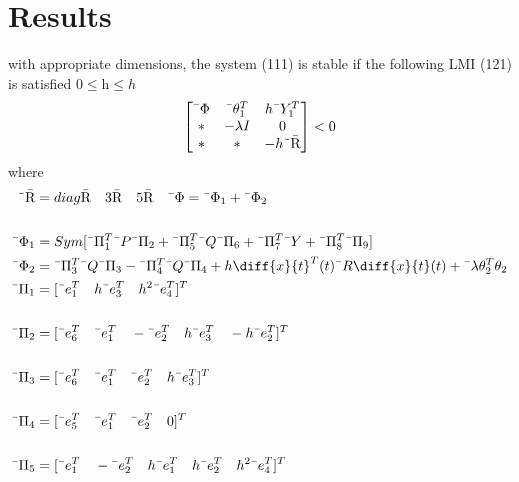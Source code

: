 \documentclass[journal]{IEEEtran}
\begin{document}
\section{Results}
with appropriate dimensions, the system (111) is stable if the following LMI (121) is satisfied $0\leqslant\text{\={h}}\leqslant h$
\begin{equation}
\begin{bmatrix}
\text{\={$\Phi$}} & \text{\={$\theta^{T}_{1}$}} & h\text{\={$Y^{T}_{1}$}} \\
* & -\lambda I   & 0 \\
* & * & -h\text{\~{\={R}}}
\end{bmatrix}
< 0
\end{equation}
where 
\begin{align}
\text{\~{\={R}}} &= diag{\text{\={R}} \quad 3\text{\={R}} \quad 5\text{\={R}}} \quad \text{\={$\Phi$}} = \text{\={$\Phi_1$}} + \text{\={$\Phi_2$}} \\ \\
\text{\={$\Phi_1$}}& = Sym[\text{\={$\Pi^{T}_{1}$}}\text{\={$P$}}\text{\={$\Pi_2$}} + \text{\={$\Pi^{T}_{5}$}}\text{\={$Q$}}\text{\={$\Pi_{6}$}} + \text{\={$\Pi^{T}_{7}$}}\text{\={$Y$}} + \text{\={$\Pi^{T}_{8}$}}\text{\={$\Pi_{9}$}}] \\ 
\text{\={$\Phi_{2}$}}& = \text{\={$\Pi^{T}_{3}$}}\text{\={$Q$}}\text{\={$\Pi_{3}$}} - \text{\={$\Pi^{T}_{4}$}}\text{\={$Q$}}\text{\={$\Pi_{4}$}} + h\diff{x}{t}^T(t)\text{\={$R$}}\diff{x}{t}(t) + \text{\={$\lambda$}}\theta^{T}_{2}\theta_2 \\ 
\text{\={$\Pi_{1}$}} &= [\text{\={$e^{T}_{1}$}} \quad h\text{\={$e^{T}_{3}$}} \quad h^2\text{\={$e^{T}_{4}$}}]^T \\ \\
\text{\={$\Pi_{2}$}} &= [\text{\={$e^{T}_{6}$}} \quad \text{\={$e^{T}_{1}$}} \quad -\text{\={$e^{T}_{2}$}} \quad h\text{\={$e^{T}_{3}$}} \quad -h\text{\={$e^{T}_{2}$}} ]^T \\ \\ 
\text{\={$\Pi_{3}$}} &= [\text{\={$e^{T}_{6}$}} \quad \text{\={$e^{T}_{1}$}} \quad \text{\={$e^{T}_{2}$}} \quad h\text{\={$e^{T}_{3}$}}]^T \\ \\
\text{\={$\Pi_{4}$}} &= [\text{\={$e^{T}_{5}$}} \quad \text{\={$e^{T}_{1}$}} \quad \text{\={$e^{T}_{2}$}} \quad 0]^T \\ \\
\text{\={$\Pi_{5}$}} &= [\text{\={$e^{T}_{1}$}} \quad -\text{\={$e^{T}_{2}$}} \quad h\text{\={$e^{T}_{1}$}} \quad h\text{\={$e^{T}_{2}$}} \quad h^2\text{\={$e^{T}_{4}$}}]^T \\ \\

\end{align}
\end{document}
